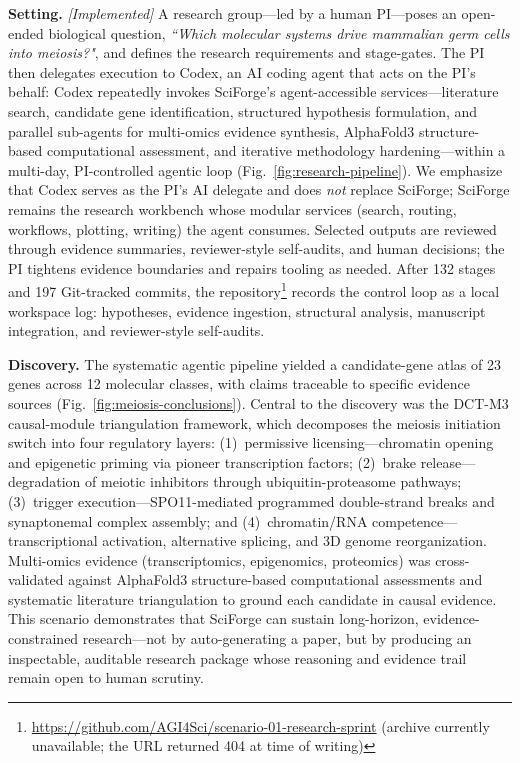 \documentclass[sn-basic,Numbered,pdflatex]{sn-jnl}
\begin{document}
\textbf{Setting.} \textit{[Implemented]} A research group---led by a human PI---poses an open-ended biological question, \textit{``Which molecular systems drive mammalian germ cells into meiosis?"}, and defines the research requirements and stage-gates. The PI then delegates execution to Codex, an AI coding agent that acts on the PI's behalf: Codex repeatedly invokes SciForge's agent-accessible services---literature search, candidate gene identification, structured hypothesis formulation, and parallel sub-agents for multi-omics evidence synthesis, AlphaFold3 structure-based computational assessment, and iterative methodology hardening---within a multi-day, PI-controlled agentic loop (Fig.~\ref{fig:research-pipeline}). We emphasize that Codex serves as the PI's AI delegate and does \emph{not} replace SciForge; SciForge remains the research workbench whose modular services (search, routing, workflows, plotting, writing) the agent consumes. Selected outputs are reviewed through evidence summaries, reviewer-style self-audits, and human decisions; the PI tightens evidence boundaries and repairs tooling as needed. After 132 stages and 197 Git-tracked commits, the repository\footnote{\url{https://github.com/AGI4Sci/scenario-01-research-sprint} (archive currently unavailable; the URL returned 404 at time of writing)} records the control loop as a local workspace log: hypotheses, evidence ingestion, structural analysis, manuscript integration, and reviewer-style self-audits.

\textbf{Discovery.} The systematic agentic pipeline yielded a candidate-gene atlas of 23 genes across 12 molecular classes, with claims traceable to specific evidence sources (Fig.~\ref{fig:meiosis-conclusions}). Central to the discovery was the DCT-M3 causal-module triangulation framework, which decomposes the meiosis initiation switch into four regulatory layers: (1)~permissive licensing---chromatin opening and epigenetic priming via pioneer transcription factors; (2)~brake release---degradation of meiotic inhibitors through ubiquitin-proteasome pathways; (3)~trigger execution---SPO11-mediated programmed double-strand breaks and synaptonemal complex assembly; and (4)~chromatin/RNA competence---transcriptional activation, alternative splicing, and 3D genome reorganization. Multi-omics evidence (transcriptomics, epigenomics, proteomics) was cross-validated against AlphaFold3 structure-based computational assessments and systematic literature triangulation to ground each candidate in causal evidence. This scenario demonstrates that SciForge can sustain long-horizon, evidence-constrained research---not by auto-generating a paper, but by producing an inspectable, auditable research package whose reasoning and evidence trail remain open to human scrutiny.
\end{document}
